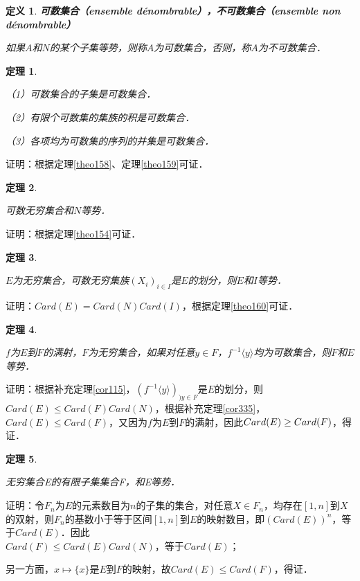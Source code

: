 \documentclass[12pt, a4paper, oneside]{book}
\newtheorem{theo}{定理}
\newtheorem{de}{定义}
\begin{document}
			\begin{de}
				\textbf{可数集合（ensemble dénombrable），不可数集合（ensemble non \\dénombrable）}
				\par
				如果$A$和$N$的某个子集等势，则称$A$为可数集合，否则，称$A$为不可数集合．
			\end{de}
			
			\begin{theo}\label{theo161}
				\hfill\par
				（1）可数集合的子集是可数集合．
				\par
				（2）有限个可数集的集族的积是可数集合．
				\par
				（3）各项均为可数集的序列的并集是可数集合．
			\end{theo}
			证明：根据定理\ref{theo158}、定理\ref{theo159}可证．
			
			\begin{theo}\label{theo162}
				\hfill\par
				可数无穷集合和$N$等势．
			\end{theo}
			证明：根据定理\ref{theo154}可证．
			
			\begin{theo}\label{theo163}
				\hfill\par
				$E$为无穷集合，可数无穷集族$(X_i)_{i\in I}$是$E$的划分，则$E$和$I$等势．
			\end{theo}
			证明：$Card(E)=Card(N)Card(I)$，根据定理\ref{theo160}可证．
			
			\begin{theo}\label{theo164}
				\hfill\par
				$f$为$E$到$F$的满射，$F$为无穷集合，如果对任意$y\in F$，$f^{-1}\langle y\rangle$均为可数集合，则$F$和$E$等势．
			\end{theo}
			证明：根据补充定理\ref{cor115}，$(f^{-1}\langle y\rangle)_{)y\in F}$是$E$的划分，则$Card(E)\leq Card(F)Card(N)$，根据补充定理\ref{cor335}，$Card(E)\leq Card(F)$，又因为$f$为$E$到$F$的满射，因此$Card(E)\geq \\Card(F)$，得证．
			
			\begin{theo}\label{theo165}
				\hfill\par
				无穷集合E的有限子集集合F，和E等势．
			\end{theo}
			证明：令$F_n$为$E$的元素数目为$n$的子集的集合，对任意$X\in F_n$，均存在$[1, n]$到$X$的双射，则$F_n$的基数小于等于区间$[1, n]$到$E$的映射数目，即$(Card(E))^n$，等于$Card(E)$．因此\\$Card(F)\leq Card(E)Card(N)$，等于$Card(E)$；
			\par
			另一方面，$x\mapsto \{x\}$是$E$到$F$的映射，故$Card(E) \leq Card(F)$，得证．
			
\end{document}

